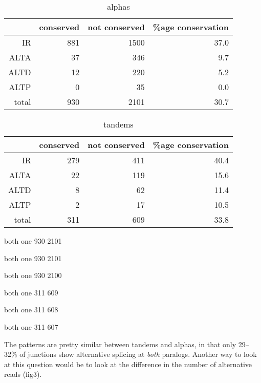 \documentclass{article}
\begin{document}
\begin{table}[ht]
\centering
\begin{tabular}{rrrr}
  \hline
 & conserved & not conserved & \%age conservation \\ 
  \hline
IR & 881 & 1500 & 37.0 \\ 
  ALTA & 37 & 346 & 9.7 \\ 
  ALTD & 12 & 220 & 5.2 \\ 
  ALTP & 0 & 35 & 0.0 \\ 
  total & 930 & 2101 & 30.7 \\ 
   \hline
\end{tabular}
\caption{alphas} 
\end{table}%
\begin{table}[ht]
\centering
\begin{tabular}{rrrr}
  \hline
 & conserved & not conserved & \%age conservation \\ 
  \hline
IR & 279 & 411 & 40.4 \\ 
  ALTA & 22 & 119 & 15.6 \\ 
  ALTD & 8 & 62 & 11.4 \\ 
  ALTP & 2 & 17 & 10.5 \\ 
  total & 311 & 609 & 33.8 \\ 
   \hline
\end{tabular}
\caption{tandems} 
\end{table}
\begin{Schunk}
\begin{Soutput}
both  one 
 930 2101 
\end{Soutput}
\begin{Soutput}
both  one 
 930 2101 
\end{Soutput}
\begin{Soutput}
both  one 
 930 2100 
\end{Soutput}
\begin{Soutput}
both  one 
 311  609 
\end{Soutput}
\begin{Soutput}
both  one 
 311  608 
\end{Soutput}
\begin{Soutput}
both  one 
 311  607 
\end{Soutput}
\end{Schunk}

The patterns are pretty similar between tandems and alphas, in that only 29--32\% of junctions show alternative splicing at \textit{both} paralogs. Another way to look at this question would be to look at the difference in the number of alternative reads (fig3).\
 
\end{document}
